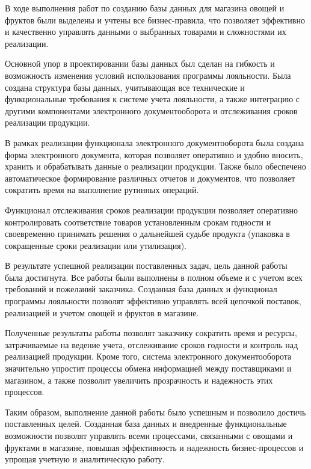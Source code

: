 \documentclass[14pt]{extreport}
\begin{document}
\conclusions{}

В ходе выполнения работ по созданию базы данных для магазина овощей и фруктов были выделены и учтены все бизнес-правила, что позволяет эффективно и качественно управлять данными о выбранных товарами и сложностями их реализации.

Основной упор в проектировании базы данных был сделан на гибкость и возможность изменения условий использования программы лояльности. Была создана структура базы данных, учитывающая все технические и функциональные требования к системе учета лояльности, а также интеграцию с другими компонентами электронного документооборота и отслеживания сроков реализации продукции.

В рамках реализации функционала электронного документооборота была создана форма электронного документа, которая позволяет оперативно и удобно вносить, хранить и обрабатывать данные о реализации продукции. Также было обеспечено автоматическое формирование различных отчетов и документов, что позволяет сократить время на выполнение рутинных операций.

Функционал отслеживания сроков реализации продукции позволяет оперативно контролировать соответствие товаров установленным срокам годности и своевременно принимать решения о дальнейшей судьбе продукта (упаковка в сокращенные сроки реализации или утилизация).

В результате успешной реализации поставленных задач, цель данной работы была достигнута. Все работы были выполнены в полном объеме и с учетом всех требований и пожеланий заказчика. Созданная база данных и функционал программы лояльности позволят эффективно управлять всей цепочкой поставок, реализацией и учетом овощей и фруктов в магазине.

Полученные результаты работы позволят заказчику сократить время и ресурсы, затрачиваемые на ведение учета, отслеживание сроков годности и контроль над реализацией продукции. Кроме того, система электронного документооборота значительно упростит процессы обмена информацией между поставщиками и магазином, а также позволит увеличить прозрачность и надежность этих процессов.

Таким образом, выполнение данной работы было успешным и позволило достичь поставленных целей. Созданная база данных и внедренные функциональные возможности позволят управлять всеми процессами, связанными с овощами и фруктами в магазине, повышая эффективность и надежность бизнес-процессов и упрощая учетную и аналитическую работу.

\newpage
\end{document}
